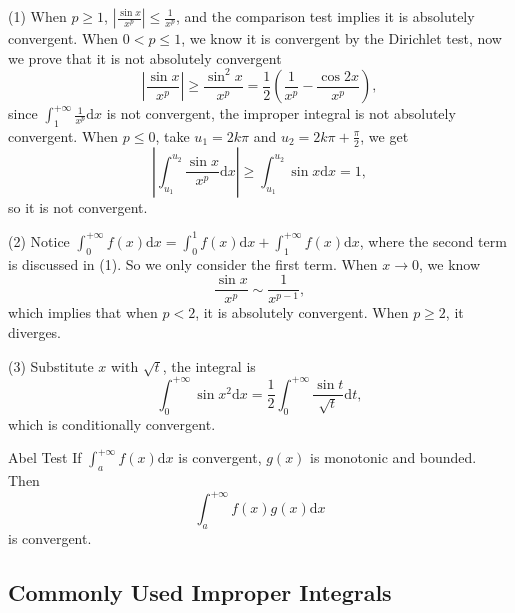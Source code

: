 \begin{solution}
  (1) When $p \geq 1$, $\left| \frac{\sin x}{x^p} \right| \leq \frac{1}{x^p}$,
  and the comparison test implies it is absolutely convergent.
  When $0 < p \leq 1$, we know it is convergent by the Dirichlet test,
  now we prove that it is not absolutely convergent
  \begin{equation}
    \left| \frac{\sin x}{x^p} \right| \geq \frac{\sin^2 x}{x^p}
    = \frac{1}{2} \left( \frac{1}{x^p} - \frac{\cos 2x}{x^p} \right),
  \end{equation}
  since $\int_1^{+\infty} \frac{1}{x^p}\mathrm{d} x$ is not convergent,
  the improper integral is not absolutely convergent.
  When $p \leq 0$, take $u_1 = 2k\pi$ and $u_2 = 2k\pi + \frac{\pi}{2}$, we get
  \begin{equation}
    \left| \int_{u_1}^{u_2} \frac{\sin x}{x^p}\mathrm{d} x \right| \geq
    \int_{u_1}^{u_2} \sin x \mathrm{d} x = 1,
  \end{equation}
  so it is not convergent.

  (2) Notice $\int_0^{+\infty} f(x)\mathrm{d} x = \int_0^1 f(x)\mathrm{d} x +
  \int_1^{+\infty}f(x)\mathrm{d} x$, where the second term is discussed in (1).
  So we only consider the first term. When $x \rightarrow 0$, we know
  \begin{equation}
    \frac{\sin x}{x^p} \sim \frac{1}{x^{p-1}},
  \end{equation}
  which implies that when $p < 2$, it is absolutely convergent.
  When $p \geq 2$, it diverges.

  (3) Substitute $x$ with $\sqrt{t}$, the integral is 
  \begin{equation}
    \int_0^{+\infty} \sin x^2 \mathrm{d} x = \frac{1}{2} \int_0^{+\infty} \frac{\sin t}{\sqrt{t}}\mathrm{d} t,
  \end{equation}
  which is conditionally convergent.
\end{solution}

\begin{theorem}{Abel Test}{}
  If $\int_a^{+\infty} f(x)\mathrm{d} x$ is convergent,
  $g(x)$ is monotonic and bounded. Then
  \begin{equation}
    \int_a^{+\infty} f(x)g(x)\mathrm{d}x
  \end{equation}
  is convergent.
\end{theorem}

\subsection{Commonly Used Improper Integrals}

